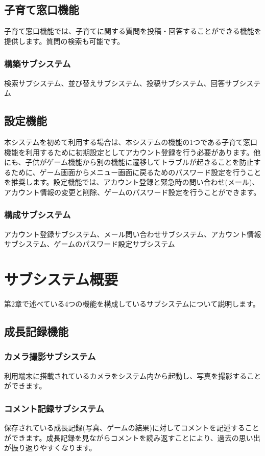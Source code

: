 \documentclass[a4j]{jarticle}
\begin{document}
\subsection{子育て窓口機能}
子育て窓口機能では、子育てに関する質問を投稿・回答することができる機能を提供します。質問の検索も可能です。
\subsubsection*{構築サブシステム}
\noindent 検索サブシステム、並び替えサブシステム、投稿サブシステム、回答サブシステム

\subsection{設定機能}
本システムを初めて利用する場合は、本システムの機能の1つである子育て窓口機能を利用するために初期設定としてアカウント登録を行う必要があります。他にも、子供がゲーム機能から別の機能に遷移してトラブルが起きることを防止するために、ゲーム画面からメニュー画面に戻るためのパスワード設定を行うことを推奨します。設定機能では、アカウント登録と緊急時の問い合わせ(メール)、アカウント情報の変更と削除、ゲームのパスワード設定を行うことができます。
\subsubsection*{構成サブシステム}
\noindent アカウント登録サブシステム、メール問い合わせサブシステム、アカウント情報サブシステム、ゲームのパスワード設定サブシステム



\newpage
\section{サブシステム概要}
第2章で述べている4つの機能を構成しているサブシステムについて説明します。

\subsection{成長記録機能}
\subsubsection*{カメラ撮影サブシステム}
利用端末に搭載されているカメラをシステム内から起動し、写真を撮影することができます。
\subsubsection*{コメント記録サブシステム}
保存されている成長記録(写真、ゲームの結果)に対してコメントを記述することができます。成長記録を見ながらコメントを読み返すことにより、過去の思い出が振り返りやすくなります。
\end{document}
